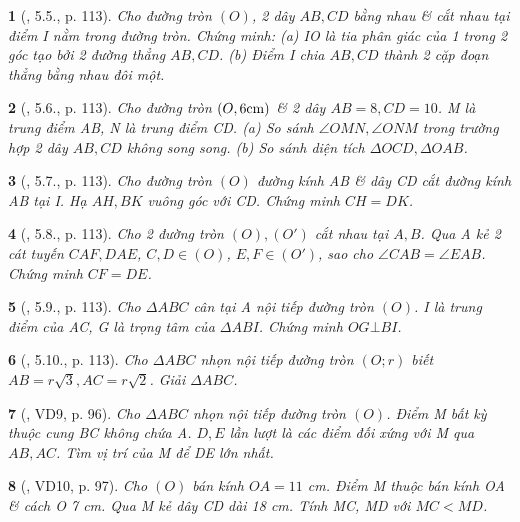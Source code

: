 \documentclass{article}
\newtheorem{baitoan}{}
\begin{document}
\begin{baitoan}[\cite{Binh_boi_duong_Toan_9_tap_1}, 5.5., p. 113]
	Cho đường tròn $(O)$, 2 dây $AB,CD$ bằng nhau \& cắt nhau tại điểm I nằm trong đường tròn. Chứng minh: (a) IO là tia phân giác của 1 trong 2 góc tạo bởi 2 đường thẳng $AB,CD$. (b) Điểm I chia $AB,CD$ thành 2 cặp đoạn thẳng bằng nhau đôi một.
\end{baitoan}

\begin{baitoan}[\cite{Binh_boi_duong_Toan_9_tap_1}, 5.6., p. 113]
	Cho đường tròn $(O,6{\rm cm})$ \& 2 dây $AB = 8,CD = 10$. M là trung điểm AB, N là trung điểm CD. (a) So sánh $\angle{OMN},\angle{ONM}$ trong trường hợp 2 dây $AB,CD$ không song song. (b) So sánh diện tích $\Delta OCD,\Delta OAB$.
\end{baitoan}

\begin{baitoan}[\cite{Binh_boi_duong_Toan_9_tap_1}, 5.7., p. 113]
	Cho đường tròn $(O)$ đường kính AB \& dây CD cắt đường kính AB tại I. Hạ $AH,BK$ vuông góc với CD. Chứng minh $CH = DK$.
\end{baitoan}

\begin{baitoan}[\cite{Binh_boi_duong_Toan_9_tap_1}, 5.8., p. 113]
	Cho 2 đường tròn $(O),(O')$ cắt nhau tại $A,B$. Qua A kẻ 2 cát tuyến $CAF,DAE$, $C,D\in(O)$, $E,F\in(O')$, sao cho $\angle{CAB} = \angle{EAB}$. Chứng minh $CF = DE$.
\end{baitoan}

\begin{baitoan}[\cite{Binh_boi_duong_Toan_9_tap_1}, 5.9., p. 113]
	Cho $\Delta ABC$ cân tại A nội tiếp đường  tròn $(O)$. I là trung điểm của AC, G là trọng tâm của $\Delta ABI$. Chứng minh $OG\bot BI$.
\end{baitoan}

\begin{baitoan}[\cite{Binh_boi_duong_Toan_9_tap_1}, 5.10., p. 113]
	Cho $\Delta ABC$ nhọn nội tiếp đường tròn $(O;r)$ biết $AB = r\sqrt{3},AC = r\sqrt{2}$. Giải $\Delta ABC$.
\end{baitoan}

\begin{baitoan}[\cite{Binh_Toan_9_tap_1}, VD9, p. 96]
	Cho $\Delta ABC$ nhọn nội tiếp đường tròn $(O)$. Điểm M bất kỳ thuộc cung BC không chứa A. $D,E$ lần lượt là các điểm đối xứng với M qua $AB,AC$. Tìm vị trí của M để DE lớn nhất.
\end{baitoan}

\begin{baitoan}[\cite{Binh_Toan_9_tap_1}, VD10, p. 97]
	Cho $(O)$ bán kính $OA = 11$ {\rm cm}. Điểm M thuộc bán kính OA \& cách O {\rm7 cm}. Qua M kẻ dây CD dài {\rm18 cm}. Tính MC, MD với $MC < MD$.
\end{baitoan}
\end{document}
